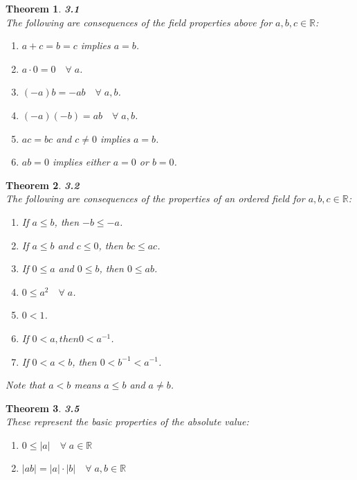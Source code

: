 \documentclass[10pt,a4paper]{article}
\newtheorem*{theorem*}{Theorem}
\theoremstyle{definition}
\begin{document}
\begin{theorem*}{\textbf{3.1}}
\\The following are consequences of the field properties above for $a,b,c \in \mathbb{R}$:
\begin{enumerate}[label = (\roman*)]
\item $a + c = b = c$ implies $a = b$.
\item $a \cdot 0 = 0 \quad \forall \; a$.
\item $(-a)b = -ab \quad \forall \; a,b$.
\item $(-a)(-b) = ab \quad \forall \; a,b$.
\item $ac = bc$ and $c \neq 0$ implies $a = b$.
\item $ab = 0$ implies either $a = 0$ or $b = 0$.
\end{enumerate}

\end{theorem*}

\begin{theorem*}{\textbf{3.2}}
\\The following are consequences of the properties of an ordered field for $a,b,c \in \mathbb{R}$:
\begin{enumerate}[label = (\roman*)]
\item If $a \leq b$, then $-b \leq -a$.
\item If $a \leq b$ and $c \leq 0$, then $bc \leq ac$.
\item If $0 \leq a$ and $0 \leq b$, then $0 \leq ab$.
\item $0 \leq a^2 \quad \forall \; a$.
\item $0 < 1$.
\item If $0 < a, then 0 < a^{-1}$.
\item If $0 < a < b$, then $0 < b^{-1} < a^{-1}$.
\end{enumerate}
Note that $a < b$ means $a \leq b$ and $a\neq b$.
\end{theorem*}

\begin{theorem*}{\textbf{3.5}}
\\These represent the basic properties of the absolute value:
\begin{enumerate}[label = (\roman*)]
\item $0 \leq |a| \quad \forall \; a \in \mathbb{R}$
\item $|ab| = |a| \cdot |b| \quad \forall \; a, b \in \mathbb{R}$
\end{enumerate}
\end{theorem*}
\end{document}
